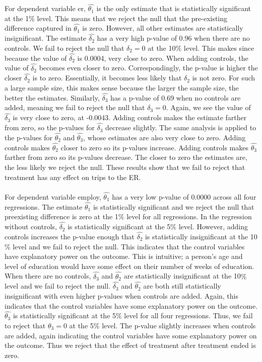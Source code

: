 \documentclass[a4paper]{article}
\begin{document}
For dependent variable er, $\hat{\theta_1}$ is the only estimate that is statistically significant at the 1$\%$ level. This means that we reject the null that the pre-existing difference captured in $\hat{\theta_1}$ is zero. However, all other estimates are statistically insignificant. The estimate $\hat{\delta_2}$ has a very high p-value of 0.96 when there are no controls. We fail to reject the null that $\delta_2 = 0$ at the 10$\%$ level. This makes since because the value of $\hat{\delta_2}$ is 0.0004, very close to zero. When adding controls, the value of $\hat{\delta_2}$ becomes even closer to zero. Correspondingly, the p-value is higher the closer $\hat{\delta_2}$ is to zero. Essentially, it becomes less likely that $\delta_2$ is not zero. For such a large sample size, this makes sense because the larger the sample size, the better the estimates. Similarly, $\hat{\delta_3}$ has a p-value of 0.69 when no controls are added, meaning we fail to reject the null that $\delta_3 = 0$. Again, we see the value of $\hat{\delta_3}$ is very close to zero, at -0.0043. Adding controls makes the estimate farther from zero, so the p-values for $\hat{\delta_3}$ decrease slightly. The same analysis is applied to the p-values for $\hat{\theta_2}$ and $\hat{\theta_3}$, whose estimates are also very close to zero. Adding controls makes $\hat{\theta_2}$ closer to zero so its p-values increase. Adding controls makes $\hat{\theta_3}$ farther from zero so its p-values decrease. The closer to zero the estimates are, the less likely we reject the null. These results show that we fail to reject that treatment has any effect on trips to the ER.
\\
\\
For dependent variable employ,  $\hat{\theta_1}$ has a very low p-value of 0.0000 across all four regressions. The estimate $\hat{\theta_1}$ is statistically significant and we reject the null that preexisting difference is zero at the 1$\%$ level for all regressions. In the regression without controls, $\hat{\delta_2}$ is statistically significant at the 5$\%$ level. However, adding controls increases the p-value enough that $\hat{\delta_2}$ is statistically insignificant at the 10$\%$ level and we fail to reject the null. This indicates that the control variables have explanatory power on the outcome. This is intuitive; a person’s age and level of education would have some effect on their number of weeks of education. When there are no controls, $\hat{\delta_3}$ and $\hat{\theta_2}$ are statistically insignificant at the 10$\%$ level and we fail to reject the null. $\hat{\delta_3}$ and $\hat{\theta_2}$ are both still statistically insignificant with even higher p-values when controls are added. Again, this indicates that the control variables have some explanatory power on the outcome. $\hat{\theta_3}$ is statistically significant at the 5$\%$ level for all four regressions. Thus, we fail to reject that $\theta_3 = 0$ at the 5$\%$ level. The p-value slightly increases when controls are added, again indicating the control variables have some explanatory power on the outcome. Thus we reject that the effect of treatment after treatment ended is zero. 
\end{document}
